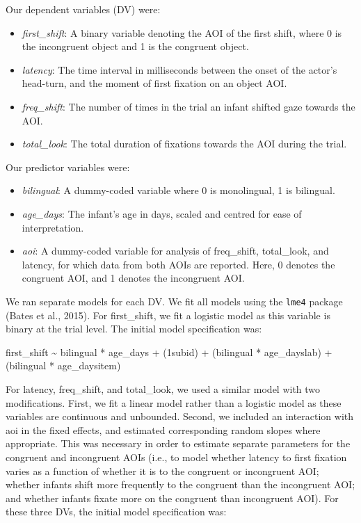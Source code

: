 \documentclass[,man,floatsintext]{apa6}
\begin{document}
Our dependent variables (DV) were:

\begin{itemize}
\item
  \emph{first\_shift}: A binary variable denoting the AOI of the first shift, where 0 is the incongruent object and 1 is the congruent object.
\item
  \emph{latency}: The time interval in milliseconds between the onset of the actor's head-turn, and the moment of first fixation on an object AOI.
\item
  \emph{freq\_shift}: The number of times in the trial an infant shifted gaze towards the AOI.
\item
  \emph{total\_look}: The total duration of fixations towards the AOI during the trial.
\end{itemize}

Our predictor variables were:

\begin{itemize}
\item
  \emph{bilingual}: A dummy-coded variable where 0 is monolingual, 1 is bilingual.
\item
  \emph{age\_days}: The infant's age in days, scaled and centred for ease of interpretation.
\item
  \emph{aoi}: A dummy-coded variable for analysis of freq\_shift, total\_look, and latency, for which data from both AOIs are reported. Here, 0 denotes the congruent AOI, and 1 denotes the incongruent AOI.
\end{itemize}

We ran separate models for each DV. We fit all models using the \texttt{lme4} package (Bates et al., 2015). For first\_shift, we fit a logistic model as this variable is binary at the trial level. The initial model specification was:

first\_shift \textasciitilde{} bilingual * age\_days +
(1\textbar{}subid) +
(bilingual * age\_days\textbar{}lab) +
(bilingual * age\_days\textbar{}item)

For latency, freq\_shift, and total\_look, we used a similar model with two modifications. First, we fit a linear model rather than a logistic model as these variables are continuous and unbounded. Second, we included an interaction with aoi in the fixed effects, and estimated corresponding random slopes where appropriate. This was necessary in order to estimate separate parameters for the congruent and incongruent AOIs (i.e., to model whether latency to first fixation varies as a function of whether it is to the congruent or incongruent AOI; whether infants shift more frequently to the congruent than the incongruent AOI; and whether infants fixate more on the congruent than incongruent AOI). For these three DVs, the initial model specification was:
\end{document}
